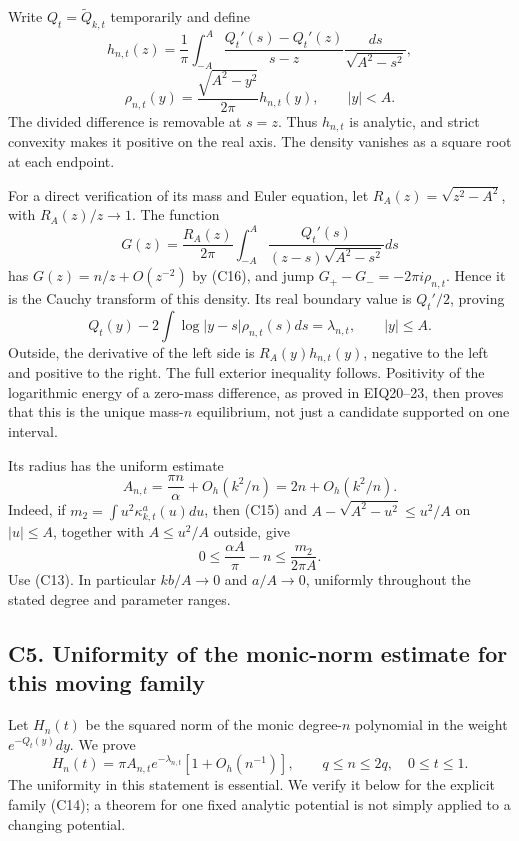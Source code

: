 \documentclass[11pt,a4paper]{article}
\begin{document}
Write \(Q_t=\widetilde Q_{k,t}\) temporarily and define \[
h_{n,t}(z)=\frac1\pi\int_{-A}^A
\frac{Q_t'(s)-Q_t'(z)}{s-z}\frac{ds}{\sqrt{A^2-s^2}},
\] \[
\rho_{n,t}(y)=\frac{\sqrt{A^2-y^2}}{2\pi}h_{n,t}(y),
\qquad |y|<A.
\tag{C17}
\] The divided difference is removable at \(s=z\). Thus \(h_{n,t}\) is
analytic, and strict convexity makes it positive on the real axis. The
density vanishes as a square root at each endpoint.

For a direct verification of its mass and Euler equation, let
\(R_A(z)=\sqrt{z^2-A^2}\), with \(R_A(z)/z\to1\). The function \[
G(z)=\frac{R_A(z)}{2\pi}\int_{-A}^A
\frac{Q_t'(s)}{(z-s)\sqrt{A^2-s^2}}ds
\] has \(G(z)=n/z+O(z^{-2})\) by (C16), and jump
\(G_+-G_-=-2\pi i\rho_{n,t}\). Hence it is the Cauchy transform of this
density. Its real boundary value is \(Q_t'/2\), proving \[
\boxed{Q_t(y)-2\int\log|y-s|\rho_{n,t}(s)ds
=\lambda_{n,t},\qquad |y|\le A.}\tag{C18}
\] Outside, the derivative of the left side is \(R_A(y)h_{n,t}(y)\),
negative to the left and positive to the right. The full exterior
inequality follows. Positivity of the logarithmic energy of a zero-mass
difference, as proved in EIQ20--23, then proves that this is the unique
mass-\(n\) equilibrium, not just a candidate supported on one interval.

Its radius has the uniform estimate \[
\boxed{A_{n,t}=\frac{\pi n}{\alpha}+O_h(k^2/n)=2n+O_h(k^2/n).}\tag{C19}
\] Indeed, if \(m_2=\int u^2\kappa^a_{k,t}(u)du\), then (C15) and
\(A-\sqrt{A^2-u^2}\le u^2/A\) on \(|u|\le A\), together with
\(A\le u^2/A\) outside, give \[
0\le\frac{\alpha A}{\pi}-n\le\frac{m_2}{2\pi A}.
\] Use (C13). In particular \(kb/A\to0\) and \(a/A\to0\), uniformly
throughout the stated degree and parameter ranges.

\subsection{C5. Uniformity of the monic-norm estimate for this moving
family}\label{sa:c5.-uniformity-of-the-monic-norm-estimate-for-this-moving-family}

Let \(H_n(t)\) be the squared norm of the monic degree-\(n\) polynomial
in the weight \(e^{-Q_t(y)}dy\). We prove \[
\boxed{H_n(t)=\pi A_{n,t}e^{-\lambda_{n,t}}
\left[1+O_h(n^{-1})\right],
\qquad q\le n\le2q,\quad0\le t\le1.}\tag{C20}
\] The uniformity in this statement is essential. We verify it below for
the explicit family (C14); a theorem for one fixed analytic potential is
not simply applied to a changing potential.
\end{document}
